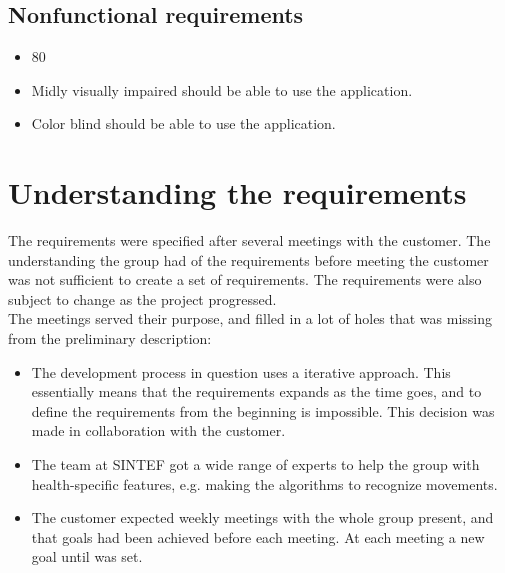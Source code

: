 \subsection{Nonfunctional requirements}
\begin{itemize}
\item 80%
\item Midly visually impaired should be able to use the application.
\item Color blind should be able to use the application.
\end{itemize}	

\section{Understanding the requirements}

The requirements were specified after several meetings with the customer. The understanding the group had of the requirements before meeting the customer was not sufficient to create a set of requirements. The requirements were also subject to change as the project progressed. \\

The meetings served their purpose, and filled in a lot of holes that was missing from the preliminary description:
\begin{itemize}
\item The development process in question uses a iterative approach. This essentially means that the requirements expands as the time goes, and to define the requirements from the beginning is impossible. This decision was made in collaboration with the customer.
\item The team at SINTEF got a wide range of experts to help the group with health-specific features, e.g. making the algorithms to recognize movements.
\item The customer expected weekly meetings with the whole group present, and that goals had been achieved before each meeting. At each meeting a new goal until was set.
\end{itemize}